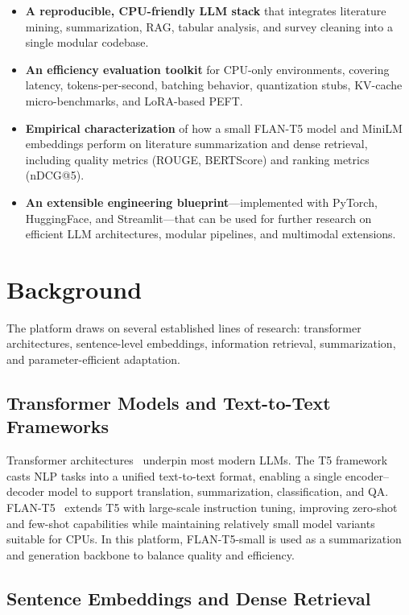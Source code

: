 \documentclass[11pt]{article}
\begin{document}
\begin{itemize}[leftmargin=1.5em]
\item \textbf{A reproducible, CPU-friendly LLM stack} that integrates literature mining, summarization, RAG, tabular analysis, and survey cleaning into a single modular codebase.
\item \textbf{An efficiency evaluation toolkit} for CPU-only environments, covering latency, tokens-per-second, batching behavior, quantization stubs, KV-cache micro-benchmarks, and LoRA-based PEFT.
\item \textbf{Empirical characterization} of how a small FLAN-T5 model and MiniLM embeddings perform on literature summarization and dense retrieval, including quality metrics (ROUGE, BERTScore) and ranking metrics (nDCG@5).
\item \textbf{An extensible engineering blueprint}---implemented with PyTorch, HuggingFace, and Streamlit---that can be used for further research on efficient LLM architectures, modular pipelines, and multimodal extensions.
\end{itemize}

\section{Background}

The platform draws on several established lines of research: transformer architectures, sentence-level embeddings, information retrieval, summarization, and parameter-efficient adaptation.

\subsection{Transformer Models and Text-to-Text Frameworks}

Transformer architectures~\citep{vaswani2017attention} underpin most modern LLMs. The T5 framework~\citep{raffel2020t5} casts NLP tasks into a unified text-to-text format, enabling a single encoder--decoder model to support translation, summarization, classification, and QA. FLAN-T5~\citep{chung2022scaling} extends T5 with large-scale instruction tuning, improving zero-shot and few-shot capabilities while maintaining relatively small model variants suitable for CPUs. In this platform, FLAN-T5-small is used as a summarization and generation backbone to balance quality and efficiency.

\subsection{Sentence Embeddings and Dense Retrieval}
\end{document}
